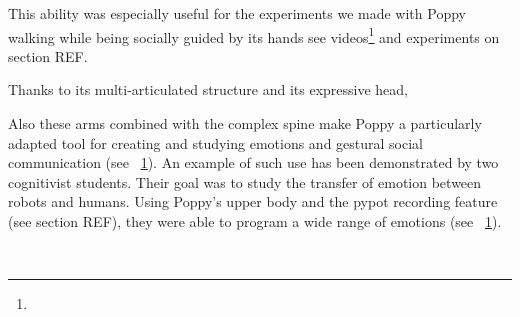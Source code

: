 This ability was especially useful for the experiments we made with Poppy walking while being socially guided by its hands see videos\footnote{} and experiments on section REF.

Thanks to its multi-articulated structure and its expressive head,

Also these arms combined with the complex spine make Poppy a particularly adapted tool for creating and studying emotions and gestural social communication (see \figurename~\ref{fig:TER_cognitic}). An example of such use has been demonstrated by two cognitivist students. Their goal was to study the transfer of emotion between robots and humans. Using Poppy's upper body and the pypot recording feature (see section REF), they were able to program a wide range of emotions (see \figurename~\ref{fig:TER_cognitic}).


\begin{figure}[tb]
\centering
    \hfil
    \\
    \hfil
    \caption{}
    \label{fig:TER_cognitic}
\end{figure}


